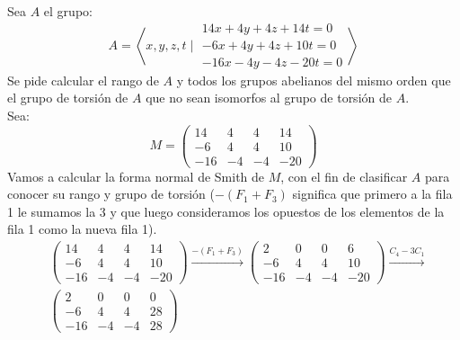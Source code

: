\begin{ejemplo}
    Sea $A$ el grupo:
    \begin{equation*}
        A = \left\langle x,y,z,t \mid \begin{array}{r}
            14x + 4y + 4z + 14t = 0 \\
            -6x + 4y + 4z + 10t = 0 \\
            -16x- 4y - 4z - 20t = 0
        \end{array}\right\rangle 
    \end{equation*}
    Se pide calcular el rango de $A$ y todos los grupos abelianos del mismo orden que el grupo de torsión de $A$ que no sean isomorfos al grupo de torsión de $A$.\\

    \noindent
    Sea:
    \begin{equation*}
        M = \left(\begin{array}{cccc}
            14 & 4 & 4 & 14 \\
            -6 & 4 & 4 & 10 \\
            -16 & -4 & -4 & -20 
        \end{array}\right)
    \end{equation*}
    Vamos a calcular la forma normal de Smith de $M$, con el fin de clasificar $A$ para conocer su rango y grupo de torsión ($-(F_1+F_3)$ significa que primero a la fila 1 le sumamos la 3 y que luego consideramos los opuestos de los elementos de la fila 1 como la nueva fila 1).
    \begin{align*}
        &\left(\begin{array}{cccc}
            14 & 4 & 4 & 14 \\
            -6 & 4 & 4 & 10 \\
            -16 & -4 & -4 & -20 
        \end{array}\right) 
        \xrightarrow{-(F_1+F_3)}
        \left(\begin{array}{cccc}
            2 & 0 & 0 & 6 \\
            -6 & 4 & 4 & 10 \\
            -16 & -4 & -4 & -20 
        \end{array}\right)  
        \xrightarrow{C_4-3C_1} \\
        &\left(\begin{array}{cccc}
            2 & 0 & 0 & 0 \\
            -6 & 4 & 4 & 28 \\
            -16 & -4 & -4 & 28
        \end{array}\right) 

\end{align*}
\end{ejemplo}
